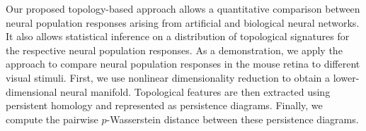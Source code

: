 \documentclass[11pt]{article}
\begin{document}
Our proposed topology-based approach allows a quantitative comparison between neural population responses arising from artificial and biological neural networks. It also allows statistical inference on a distribution of topological signatures for the respective neural population responses. As a demonstration, we apply the approach to compare neural population responses in the mouse retina to different visual stimuli. First, we use nonlinear dimensionality reduction to obtain a lower-dimensional neural manifold. Topological features are then extracted using persistent homology and represented as persistence diagrams. Finally, we compute the pairwise $p$-Wasserstein distance between these persistence diagrams. 
\end{document}
